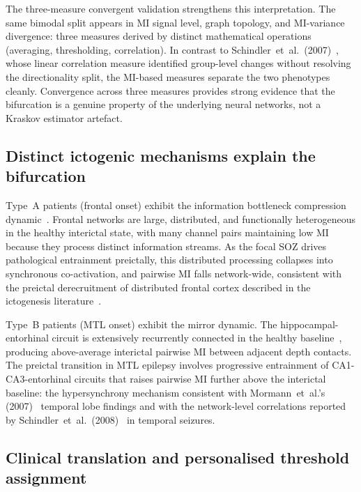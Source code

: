 \documentclass[a4paper,fleqn]{cas-dc}
\begin{document}
The three-measure convergent validation strengthens this interpretation.
%
The same bimodal split appears in MI signal level, graph topology, and
MI-variance divergence: three measures derived by distinct mathematical
operations (averaging, thresholding, correlation).
%
In contrast to Schindler~et~al.\ (2007)~\citep{schindler2008}, whose
linear correlation measure identified group-level changes without
resolving the directionality split, the MI-based measures separate the
two phenotypes cleanly.
%
Convergence across three measures provides strong evidence that the
bifurcation is a genuine property of the underlying neural networks,
not a Kraskov estimator artefact.

\subsection{Distinct ictogenic mechanisms explain the bifurcation}

Type~A patients (frontal onset) exhibit the information bottleneck
compression dynamic~\citep{tishby2000,tishby2015}.
%
Frontal networks are large, distributed, and functionally heterogeneous
in the healthy interictal state, with many channel pairs maintaining low
MI because they process distinct information streams.
%
As the focal SOZ drives pathological entrainment preictally, this
distributed processing collapses into synchronous co-activation, and
pairwise MI falls network-wide, consistent with the preictal
derecruitment of distributed frontal cortex described in the
ictogenesis literature~\citep{trevelyan2013}.

Type~B patients (MTL onset) exhibit the mirror dynamic.
%
The hippocampal-entorhinal circuit is extensively recurrently connected
in the healthy baseline~\citep{witter2002}, producing above-average
interictal pairwise MI between adjacent depth contacts.
%
The preictal transition in MTL epilepsy involves progressive entrainment
of CA1-CA3-entorhinal circuits that raises pairwise MI further above
the interictal baseline: the hypersynchrony mechanism consistent with
Mormann~et~al.'s (2007)~\citep{mormann2007} temporal lobe findings and
with the network-level correlations reported by Schindler~et~al.\
(2008)~\citep{schindler2008} in temporal seizures.

\subsection{Clinical translation and personalised threshold assignment}
\end{document}
